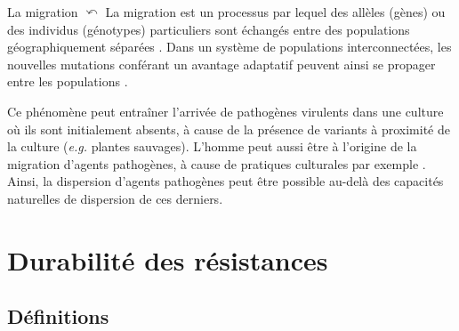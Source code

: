 \hypertarget{mig1}{}
	\begin{encadre2}{La migration}
\hyperlink{mig2}{$\curvearrowleft$}
      La migration  est un processus par lequel des allèles (gènes) ou des individus (génotypes) particuliers sont échangés entre des populations géographiquement séparées \citep{McDonald2002}.
Dans un système de populations interconnectées, les nouvelles
mutations conférant un avantage adaptatif peuvent ainsi se propager entre les populations \citep{Burdon1999}.
\par
Ce phénomène peut entraîner l’arrivée de pathogènes virulents dans une culture où ils sont initialement absents, à cause de la présence de variants à proximité de la culture  (\textit{e.g.} plantes sauvages). L'homme peut aussi être à l'origine de la migration d'agents pathogènes, à cause de pratiques culturales par exemple  \citep{Brown2002, Burdon1993}. Ainsi, la dispersion d'agents pathogènes peut être possible au-delà des capacités naturelles de dispersion de ces derniers.  
\end{encadre2}


\section{Durabilité des résistances} \label{durabilite}
    
\subsection{Définitions}
	
